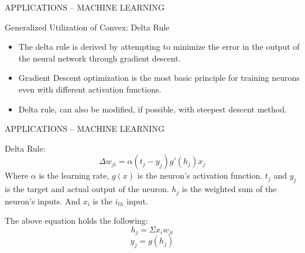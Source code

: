 \begin{frame}{ \LARGE APPLICATIONS -- MACHINE LEARNING}
  \begin{blueblock}{Generalized Utilization of Convex: Delta Rule}
\begin{itemize}
\item The delta rule is derived by attempting to minimize the error in the output of the neural network through gradient descent.
\item Gradient Descent optimization is the most basic principle for
  training neurons even with different activation functions.
\item Delta rule, can also be modified, if possible, with steepest descent method.
\end{itemize}
  \end{blueblock}

\end{frame}

\begin{frame}{ \LARGE APPLICATIONS -- MACHINE LEARNING}
  \begin{redblock}{Delta Rule:}
$$\Delta w_{ji} = \alpha (t_j - y_j)g'(h_j)x_j$$
Where $\alpha$ is the learning rate, $g(x)$ is the neuron's activation
function. $t_j$ and $y_j$ is the target and actual output of the
neuron. $h_j$ is the weighted sum of the neuron's inputs. And $x_i$ is
the $i_{th}$ input.
  \end{redblock}

  \begin{greyblock}{The above equation holds the following:}
$$h_j = \Sigma x_iw_{ji}$$
$$y_j = g(h_j)$$

  \end{greyblock}

\end{frame}

